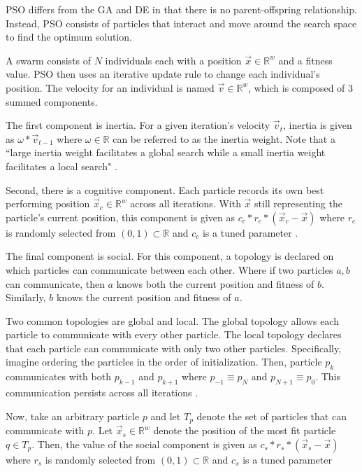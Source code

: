 \documentclass[twoside,11pt]{article}
\newcommand{\Rw}{\mathbb{R}^w }
\begin{document}
	PSO differs from the GA and DE in that there is no parent-offspring relationship. Instead, PSO consists of particles that interact and move around the search space to find the optimum solution. 
	
	A swarm consists of $N$ individuals each with a position $\vec{x} \in \Rw$ and a fitness value. 
	PSO then uses an iterative update rule to change each individual's position. The velocity for an individual is named $\vec{v} \in \Rw$, which is composed of 3 summed components.
	
	The first component is inertia. For a given iteration's velocity $\vec{v}_t$, inertia is given as $\omega * \vec{v}_{t-1}$ where $\omega \in \mathbb{R}$ can be referred to as the inertia weight. Note that a ``large inertia weight facilitates a global search while a small inertia weight facilitates a local search" \citep{empirical-pso}.
	
	Second, there is a cognitive component. 
	Each particle records its own best performing position $\vec{x}_c \in \Rw$ across all iterations. 
	With $\vec{x}$ still representing the particle's current position, this component is given as $c_c * r_c * (\vec{x}_c - \vec{x})$ where $r_c$ is randomly selected from $(0,1) \subset \mathbb{R}$ and $c_c$ is a tuned parameter \citep{og-pso}.
	
	The final component is social. 
	For this component, a topology is declared on which particles can communicate between each other.
	Where if two particles $a,b$ can communicate, then $a$ knows both the current position and fitness of $b$.
	Similarly, $b$ knows the current position and fitness of $a$.
	
	Two common topologies are global and local. 
	The global topology allows each particle to communicate with every other particle. 
	The local topology declares that each particle can communicate with only two other particles.
	Specifically, imagine ordering the particles in the order of initialization.
	Then, particle $p_k$ communicates with both $p_{k-1}$ and $p_{k+1}$ where $p_{-1} \equiv p_N$ and $p_{N+1} \equiv p_{0}$.
	This communication persists across all iterations \citep{og-pso}.
	
	Now, take an arbitrary particle $p$ and let $T_p$ denote the set of particles that can communicate with $p$.
	Let $\vec{x}_s \in \Rw$ denote the position of the most fit particle $q \in T_p$. Then, the value of the social component is given as $c_s * r_s * (\vec{x}_s - \vec{x})$ where $r_s$ is randomly selected from $(0,1) \subset \mathbb{R}$ and $c_s$ is a tuned parameter
	
\end{document}
